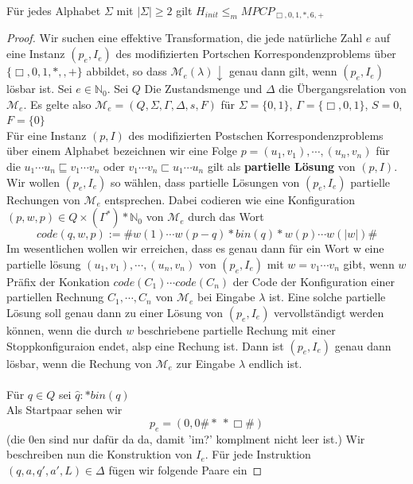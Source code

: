     Für jedes Alphabet \(\Sigma\) mit \(|\Sigma| \geq 2\) gilt \(H_{init} \leq_m MPCP_{\Box, 0, 1, *, 6, +}\)

    \begin{proof}
      Wir suchen eine effektive Transformation, die jede natürliche Zahl \(e\) auf eine Instanz \((p_e,I_e)\) des modifizierten Portschen Korrespondenzproblems über \(\{\Box, 0, 1, *, , +\}\) abbildet, so dass \(\mathcal{M} _e(\lambda)\downarrow\) genau dann gilt, wenn \((p_e, I_e)\) lösbar ist. Sei \(e \in \mathbb{N}_0\). Sei \(Q\) Die Zustandsmenge und \(\Delta\) die Übergangsrelation von \(\mathcal{M}_e\). Es gelte also \(\mathcal{M}_e = (Q, \Sigma, \Gamma, \Delta, s, F)\) für \(\Sigma = \{0, 1\}\), \(\Gamma = \{\Box, 0, 1\}\), \(S = 0\), \(F = \{0\}\) \\ Für eine Instanz \((p, I)\) des modifizierten Postschen Korrespondenzproblems über einem Alphabet bezeichnen wir eine Folge \(p =  (u_1, v_1), \cdots, (u_n, v_n)\) für die \(u_1 \cdots u_n \sqsubseteq v_1 \cdots v_n\) oder \(v_1 \cdots v_n \sqsubset u_1 \cdots u_n\) gilt als \textbf{partielle Lösung} von \((p, I)\). Wir wollen \((p_e, I_e)\) so wählen, dass partielle Lösungen von \((p_e, I_e)\) partielle Rechungen von \(\mathcal{M}_e\) entsprechen. Dabei codieren wie eine Konfiguration \((p, w, p) \in Q \times(\Gamma^*)*\mathbb{N}_0\) von \(\mathcal{M}_e\) durch das Wort 
      \[
        code (q, w, p) := \# w(1)\cdots w(p-q) * bin(q)* w(p) \cdots w(|w|)\#
      \]
      Im wesentlichen wollen wir erreichen, dass es genau dann für ein Wort w eine partielle lösung  \((u_1, v_1), \cdots, (u_n, v_n)\) von \((p_e, I_e)\) mit \(w = v_1 \cdots v_n\) gibt, wenn \(w\) Präfix der Konkation \(code (C_1) \cdots code (C_n)\) der Code der Konfiguration einer partiellen Rechnung \(C_1, \cdots, C_n\) von \(\mathcal{M}_e\) bei Eingabe \(\lambda\) ist. Eine solche partielle Lösung soll genau dann zu einer Lösung von \((p_e, I_e)\) vervollständigt werden können, wenn die durch \(w\) beschriebene partielle Rechung mit einer Stoppkonfiguraion endet, alsp eine Rechung ist. Dann ist \((p_e, I_e)\) genau dann lösbar, wenn die Rechung von \(\mathcal{M}_e\) zur Eingabe \(\lambda\) endlich ist. \\\\ Für \(q \in Q\) sei \(\hat{q} : * bin(q)\)\\ Als Startpaar sehen wir 
      \[
        p_e = (0, 0 \# * \ *\Box\#)
      \]
      (die 0en sind nur dafür da da, damit 'im?' komplment nicht leer ist.) Wir beschreiben nun die Konstruktion von \(I_e\). Für jede Instruktion \((q, a, q', a', L) \in \Delta\) fügen wir folgende Paare ein 

\end{proof}
